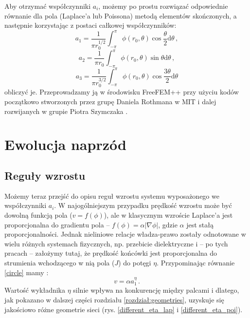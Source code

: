 \documentclass[]{pracamgr}
\begin{document}
    Aby otrzymać współczynniki $a_i$, możemy po prostu rozwiązać odpowiednie równanie dla pola (Laplace'a lub Poissona) metodą elementów skończonych, a następnie korzystając z postaci całkowej współczynników:
    \begin{equation}\label{a1}
      a_1 = \frac{1}{\pi r_0^{1/2}}\int^{\pi}_{-\pi} \phi(r_0,\theta)\cos\frac{\theta}{2}\textrm{d}\theta \,,
    \end{equation} 
    \begin{equation}\label{a2}
      a_2 = \frac{1}{\pi r_0}\int^{\pi}_{-\pi} \phi(r_0,\theta)\sin\theta \textrm{d}\theta \,,
    \end{equation}
    \begin{equation}\label{a3}
      a_3 = \frac{1}{\pi r_0^{3/2}}\int^{\pi}_{-\pi} \phi(r_0,\theta)\cos\frac{3\theta}{2}\textrm{d}\theta
    \end{equation}	
    obliczyć je. Przeprowadzamy ją w środowisku FreeFEM++ \cite{hecht2012new} przy użyciu kodów początkowo stworzonych przez grupę Daniela Rothmana w MIT \cite{petroff2011geometry, petroff2013bifurcation, cohen2015path} i dalej rozwijanych w grupie Piotra Szymczaka \cite{morawiecki2016problem, zukowski2019zwiazek} .



  \chapter{Ewolucja naprzód}
    
    \section{Reguły wzrostu}

      Możemy teraz przejść do opisu reguł wzrostu systemu wyposażonego we współczynniki $a_i$. W najogólniejszym przypadku prędkość wzrostu może być dowolną funkcją pola ($v = f(\phi)$), ale w klasycznym wzroście Laplace'a jest proporcjonalna do gradientu pola -- $f(\phi) = \alpha |\nabla \phi|$, gdzie $\alpha$ jest stałą proporcjonalności. Jednak nieliniowe relacje władza-prawo zostały odnotowane w wielu różnych systemach fizycznych, np. przebicie dielektryczne \cite{niemeyer1984fractal} i -- po tych pracach -- założymy tutaj, że prędkość końcówki jest proporcjonalna do strumienia wchodzącego w nią pola ($J$) do potęgi $\eta$. Przypominając równanie \eqref{circle} mamy \cite{carleson2002laplacian, selander1999two}:
      \begin{equation}\label{velocity}
        v = \alpha a_1^\eta \,.
      \end{equation}
      Wartość wykładnika $\eta$ silnie wpływa na konkurencję między palcami i dlatego, jak pokazano w dalszej części rozdziału \ref{rozdział:geometries}, uzyskuje się jakościowo różne geometrie sieci (rys. \ref{different_eta_lap} i \ref{different_eta_poi}).
\end{document}
